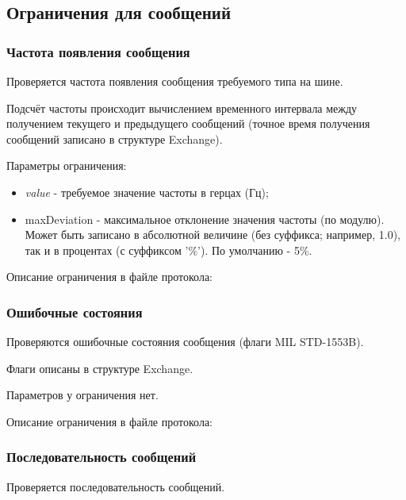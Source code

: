 \subsection{Ограничения для сообщений}

\subsubsection{Частота появления сообщения}

Проверяется частота появления сообщения требуемого типа на шине.

Подсчёт частоты происходит вычислением временного интервала между получением 
текущего и предыдущего сообщений (точное время получения сообщений записано в 
структуре Exchange).

Параметры ограничения:

\begin{itemize}
 \item \textit{value} - требуемое значение частоты в герцах (Гц);
 \item maxDeviation - максимальное отклонение значения частоты (по модулю).  
Может быть записано в абсолютной величине (без суффикса; например, 1.0), так и 
в процентах (с суффиксом '\%'). По умолчанию - 5\%.
\end{itemize}

Описание ограничения в файле протокола:



\subsubsection{Ошибочные состояния}

Проверяются ошибочные состояния сообщения (флаги MIL STD-1553B).

Флаги описаны в структуре Exchange.

Параметров у ограничения нет.

Описание ограничения в файле протокола:



\subsubsection{Последовательность сообщений}

Проверяется последовательность сообщений.


